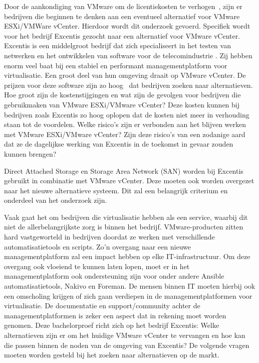 Door de aankondiging van VMware om de licentiekosten te verhogen~\autocite{device42_2024}, zijn er bedrijven die beginnen te denken aan een eventueel alternatief voor VMware ESXi/VMWare vCenter.
Hierdoor wordt dit onderzoek gevoerd. Specifiek wordt voor het bedrijf Excentis gezocht naar een alternatief voor VMware vCenter.
Excentis is een middelgroot bedrijf dat zich specialiseert in het testen van netwerken en het ontwikkelen van software voor de telecomindustrie \autocite{excentis2025}.
Zij hebben enorm veel baat bij een stabiel en performant managementplatform voor virtualisatie. Een groot deel van hun omgeving draait op VMware vCenter.
De prijzen voor deze software zijn zo hoog~\autocite{Hale2024} dat bedrijven zoeken naar alternatieven.
Hoe groot zijn de kostenstijgingen en wat zijn de gevolgen voor bedrijven die gebruikmaken van VMware ESXi/VMware vCenter?
Deze kosten kunnen bij bedrijven zoals Excentis zo hoog oplopen dat de kosten niet meer in verhouding staan tot de voordelen.
Welke risico's zijn er verbonden aan het blijven werken met VMware ESXi/VMware vCenter?
Zijn deze risico’s van een zodanige aard dat ze de dagelijkse werking van Excentis in de toekomst in gevaar zouden kunnen brengen?

Direct Attached Storage en Storage Area Network (SAN) worden bij Excentis gebruikt in combinatie met VMware vCenter.
Deze moeten ook worden overgezet naar het nieuwe alternatieve systeem. Dit zal een belangrijk criterium en onderdeel van het onderzoek zijn.

Vaak gaat het om bedrijven die virtualisatie hebben als een service, waarbij dit niet de allerbelangrijkste zorg is binnen het bedrijf.
VMware-producten zitten hard vastgeworteld in bedrijven doordat ze werken met verschillende automatisatietools en scripts. Zo'n overgang naar een nieuwe managementplatform zal een impact hebben op elke IT-infrastructuur.
Om deze overgang ook vloeiend te kunnen laten lopen, moet er in het managementplatform ook ondersteuning zijn voor onder andere Ansible automatisatietools, Nakivo en Foreman.
De mensen binnen IT moeten hierbij ook een omscholing krijgen of zich gaan verdiepen in de managementplatformen  voor virtualisatie. De documentatie en support/community achter de managementplatformen is zeker een aspect dat in rekening moet worden genomen.
Deze bachelorproef richt zich op het bedrijf Excentis: Welke alternatieven zijn er om het huidige VMware vCenter te vervangen en hoe kan die passen binnen de noden van de omgeving van Excentis?
De volgende vragen moeten worden gesteld bij het zoeken naar alternatieven op de markt.


